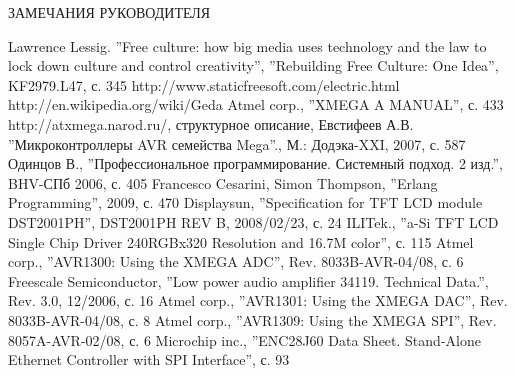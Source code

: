 \documentclass[russian,simple,utf8,pointsubsection,reduceheight=20mm]{eskdtext}
\begin{document}
\pagestyle{plain}
\thispagestyle{empty}

\newpage

\setlength{\footskip}{10mm}

\renewcommand{\contentsname}{СОДЕРЖАНИЕ}

\begin{center}
\MakeUppercase{ЗАМЕЧАНИЯ РУКОВОДИТЕЛЯ}
\end{center}
\newpage

\tableofcontents
\newpage











\renewcommand{\refname}{СПИСОК ЛИТЕРАТУРЫ}

\begin{thebibliography}{99}
 Lawrence Lessig. ''Free culture: how big media uses technology and the law to lock down
culture and control creativity'', ''Rebuilding Free Culture: One Idea'', KF2979.L47, с. 345
 http://www.staticfreesoft.com/electric.html
 http://en.wikipedia.org/wiki/Geda
 Atmel corp., ''XMEGA A MANUAL'', с. 433
 http://atxmega.narod.ru/, структурное описание, 
 Евстифеев А.В. ''Микроконтроллеры AVR семейства Mega''., М.: Додэка-XXI, 2007, с. 587
 Одинцов В., ''Профессиональное программирование. Системный подход. 2 изд.'', BHV-СПб 2006, с. 405
 Francesco Cesarini, Simon Thompson, ''Erlang Programming'', 2009, с. 470
 Displaysun, ''Specification for TFT LCD module DST2001PH'', DST2001PH REV B, 2008/02/23, с. 24
 ILITek., ''a-Si TFT LCD Single Chip Driver 240RGBx320 Resolution and 16.7M color'', с. 115
 Atmel corp., ''AVR1300: Using the XMEGA ADC'', Rev. 8033B-AVR-04/08, с. 6
 Freescale Semiconductor, ''Low power audio amplifier 34119. Technical Data.'', Rev. 3.0, 12/2006, с. 16
 Atmel corp., ''AVR1301: Using the XMEGA DAC'', Rev. 8033B-AVR-04/08, с. 8
 Atmel corp., ''AVR1309: Using the XMEGA SPI'', Rev. 8057A-AVR-02/08, с. 6
 Microchip inc., ''ENC28J60 Data Sheet. Stand-Alone Ethernet Controller with SPI Interface'', с. 93
\end{thebibliography}
\end{document}
